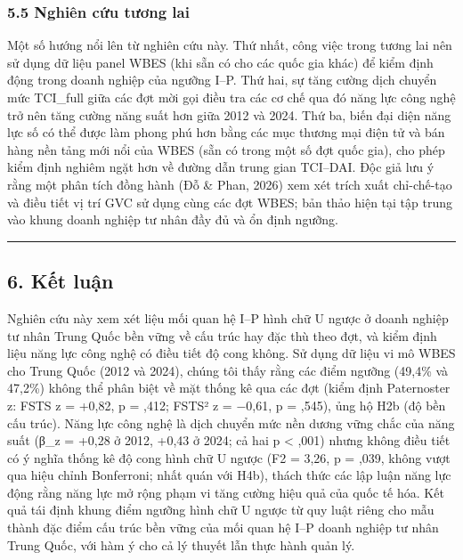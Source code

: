 \documentclass[12pt,a4paper]{article}
\begin{document}
\hypertarget{55-nghiuxean-cux1ee9u-tux1b0ux1a1ng-lai}{%
\subsubsection{5.5 Nghiên cứu tương
lai}\label{55-nghiuxean-cux1ee9u-tux1b0ux1a1ng-lai}}

Một số hướng nổi lên từ nghiên cứu này. Thứ nhất, công việc trong tương
lai nên sử dụng dữ liệu panel WBES (khi sẵn có cho các quốc gia khác) để
kiểm định động trong doanh nghiệp của ngưỡng I--P. Thứ hai, sự tăng
cường dịch chuyển mức TCI\_full giữa các đợt mời gọi điều tra các cơ chế
qua đó năng lực công nghệ trở nên tăng cường năng suất hơn giữa 2012 và
2024. Thứ ba, biến đại diện năng lực số có thể được làm phong phú hơn
bằng các mục thương mại điện tử và bán hàng nền tảng mới nổi của WBES
(sẵn có trong một số đợt quốc gia), cho phép kiểm định nghiêm ngặt hơn
về đường dẫn trung gian TCI--DAI. Độc giả lưu ý rằng một phân tích đồng
hành (Đỗ \& Phan, 2026) xem xét trích xuất chỉ-chế-tạo và điều tiết vị
trí GVC sử dụng cùng các đợt WBES; bản thảo hiện tại tập trung vào khung
doanh nghiệp tư nhân đầy đủ và ổn định ngưỡng.

\begin{center}\rule{0.5\linewidth}{0.5pt}\end{center}

\hypertarget{6-kux1ebft-luux1eadn}{%
\subsection{6. Kết luận}\label{6-kux1ebft-luux1eadn}}

Nghiên cứu này xem xét liệu mối quan hệ I--P hình chữ U ngược ở doanh
nghiệp tư nhân Trung Quốc bền vững về cấu trúc hay đặc thù theo đợt, và
kiểm định liệu năng lực công nghệ có điều tiết độ cong không. Sử dụng dữ
liệu vi mô WBES cho Trung Quốc (2012 và 2024), chúng tôi thấy rằng các
điểm ngưỡng (49,4\% và 47,2\%) không thể phân biệt về mặt thống kê qua
các đợt (kiểm định Paternoster z: FSTS z = +0,82, p = ,412; FSTS² z =
−0,61, p = ,545), ủng hộ H2b (độ bền cấu trúc). Năng lực công nghệ là
dịch chuyển mức nền dương vững chắc của năng suất (β\_z = +0,28 ở 2012,
+0,43 ở 2024; cả hai p \textless{} ,001) nhưng không điều tiết có ý
nghĩa thống kê độ cong hình chữ U ngược (F2 = 3,26, p = ,039, không vượt
qua hiệu chỉnh Bonferroni; nhất quán với H4b), thách thức các lập luận
năng lực động rằng năng lực mở rộng phạm vi tăng cường hiệu quả của quốc
tế hóa. Kết quả tái định khung điểm ngưỡng hình chữ U ngược từ quy luật
riêng cho mẫu thành đặc điểm cấu trúc bền vững của mối quan hệ I--P
doanh nghiệp tư nhân Trung Quốc, với hàm ý cho cả lý thuyết lẫn thực
hành quản lý.
\end{document}
